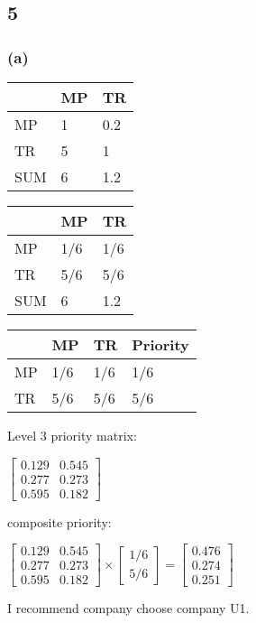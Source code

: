 \documentclass{article}
\begin{document}
\subsection*{5}
\subsubsection*{(a)}
\begin{tabular}{|l|l|l|}
\hline
    & MP & TR  \\ \hline
MP  & 1  & 0.2 \\ \hline
TR  & 5  & 1   \\ \hline
SUM & 6  & 1.2 \\ \hline
\end{tabular}\par\indent
\par\indent
\par
\begin{tabular}{|l|l|l|}
\hline
    & MP  & TR  \\ \hline
MP  & 1/6 & 1/6 \\ \hline
TR  & 5/6 & 5/6 \\ \hline
SUM & 6   & 1.2 \\ \hline
\end{tabular}\par\indent
\par\indent
\par
\begin{tabular}{|l|l|l|l|}
\hline
   & MP  & TR  & Priority \\ \hline
MP & 1/6 & 1/6 & 1/6      \\ \hline
TR & 5/6 & 5/6 & 5/6      \\ \hline
\end{tabular}\par\indent
\par\indent
\par
Level 3 priority matrix:\par\indent
\par
$\begin{bmatrix}
0.129 & 0.545 \\
0.277 & 0.273 \\
0.595 & 0.182
\end{bmatrix}$\par\indent
\par
composite priority:\par\indent
\par
$\begin{bmatrix}
0.129 & 0.545 \\
0.277 & 0.273 \\
0.595 & 0.182
\end{bmatrix}\times \begin{bmatrix} 1/6 \\ 5/6 \end{bmatrix}=\begin{bmatrix}
0.476\\
0.274\\
0.251
\end{bmatrix}$\par\indent
\par
I recommend company choose company U1.
\end{document}
